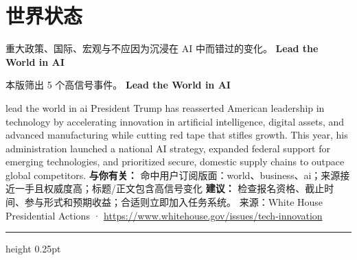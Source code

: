 \documentclass[10.5pt]{ctexart}
\begin{document}
\section*{世界状态}
{\color{ormuted} 重大政策、国际、宏观与不应因为沉浸在 AI 中而错过的变化。}
\vspace{2mm}
{\LARGE\bfseries Lead the World in AI}\par
\vspace{1mm}
{\color{ormuted} 本版筛出 5 个高信号事件。}
\vspace{3mm}
{\Large\bfseries Lead the World in AI}\par
lead the world in ai President Trump has reasserted American leadership in technology by accelerating innovation in artificial intelligence, digital assets, and advanced manufacturing while cutting red tape that stifles growth. This year, his administration launched a national AI strategy, expanded federal support for emerging technologies, and prioritized secure, domestic supply chains to outpace global competitors.
\textbf{与你有关：} 命中用户订阅版面：world、business、ai；来源接近一手且权威度高；标题/正文包含高信号变化
\textbf{建议：} 检查报名资格、截止时间、参与形式和预期收益；合适则立即加入任务系统。
{\footnotesize\color{ormuted} 来源：White House Presidential Actions · \url{https://www.whitehouse.gov/issues/tech-innovation}}
\vspace{4mm}
\hrule height 0.25pt
\vspace{3mm}
\end{document}
